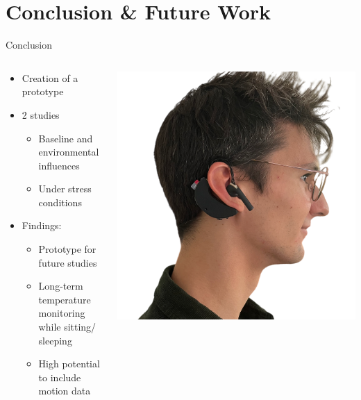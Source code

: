 \documentclass[en]{sdqbeamer}
\begin{document}
\section{Conclusion \& Future Work}
\begin{frame}{Conclusion}
    \begin{center}
      \begin{columns}[T]
        \begin{column}{.55\textwidth}
          \begin{itemize}
              \item Creation of a prototype
              \item 2 studies
              \begin{itemize}
                  \item Baseline and environmental influences
                  \item Under stress conditions
              \end{itemize}
              \item Findings:
              \begin{itemize}
                  \item Prototype for future studies
                  \item Long-term temperature monitoring while sitting/ sleeping
                  \item High potential to include motion data
              \end{itemize}
              
          \end{itemize}
        \end{column}
        
        \begin{column}{.4\textwidth}
          \includegraphics[width=0.8\linewidth]{../thesis-doc/images/prototype/Lorenz.png} 
        \end{column}
      \end{columns}
    \end{center}
\end{frame}
\end{document}
